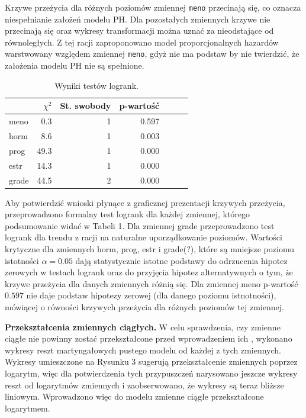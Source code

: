 \documentclass[]{article}
\begin{document}
Krzywe przeżycia dla różnych poziomów zmiennej \texttt{meno} przecinają
się, co oznacza niespełnianie założeń modelu PH. Dla pozostałych
zmiennych krzywe nie przecinają się oraz wykresy transformacji można
uznać za nieodstające od równoległych. Z tej racji zaproponowano model
proporcjonalnych hazardów warstwowany względem zmiennej \texttt{meno},
gdyż nie ma podstaw by nie twierdzić, że założenia modelu PH nie są
spełnione.

\begin{table}
\vspace{-20pt}
\caption{ Wyniki testów logrank. }
\begin{tabular}{lrrrrrr}
\toprule%
\ &$\chi^2$&St. swobody&p-wartość\\ \toprule meno&0.3&1&0.597\\ horm&8.6&1&0.003\\ prog&49.3&1&0.000\\ estr&14.3&1&0.000\\ grade&44.5&2&0.000\\  \bottomrule
\end{tabular}
\vspace{-7.5pt}
\end{table}

Aby potwierdzić wnioski płynące z graficznej prezentacji krzywych
przeżycia, przeprowadzono formalny test logrank dla każdej zmiennej,
którego podsumowanie widać w Tabeli 1. Dla zmiennej \textsf{grade}
przeprowadzono test logrank dla trendu z racji na naturalne
uporządkowanie poziomów. Wartości krytyczne dla zmiennych \textsf{horm},
\textsf{prog}, \textsf{estr} i \textsf{grade}(?), które są mniejsze
 poziomu istotności \(\alpha=0.05\) dają
statystycznie istotne podstawy do odrzucenia hipotez zerowych w testach
logrank oraz do przyjęcia hipotez alternatywnych o tym, że krzywe
przeżycia dla danych zmiennych różnią się. Dla zmiennej \textsf{meno}
p-wartość \(0.597\) nie daje podstaw  hipotezy
zerowej (dla danego poziomu istnotności), mówiącej o równości krzywych
przeżycia dla różnych poziomów tej zmiennej.

\newpage
\textbf{Przekształcenia zmiennych ciągłych.} \newline
W celu sprawdzenia, czy zmienne ciągłe nie powinny zostać przekształcone
przed wprowadzeniem ich , wykonano wykresy reszt
martyngałowych pustego modelu od każdej z tych zmiennych. Wykresy
umieszczone na Rysunku 3 sugerują przekształcenie zmiennych poprzez
logarytm, więc dla potwierdzenia tych przypuszczeń narysowano jeszcze
wykresy reszt od logarytmów zmiennych i zaobserwowano, że wykresy są
teraz bliższe liniowym. Wprowadzono więc do modelu zmienne ciągłe
przekształcone logarytmem.
\end{document}
